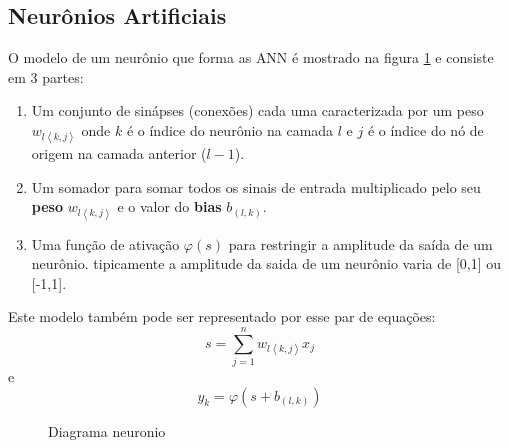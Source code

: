 \subsection{Neur\^onios Artificiais}
O modelo de um neur\^onio que forma as \ac{ANN} \'e mostrado na figura \ref{fig:neuronioartificial} e consiste em 3 partes:
\begin{enumerate}
	\item Um conjunto de sin\'apses (conex\~oes) cada uma caracterizada por um peso $w_{l\left< k,j \right> }$ onde $k$ \'e o \'indice do neur\^onio na camada $l$ e $j$ \'e o \'indice do n\'o de origem na camada anterior ($l-1$).
	\item Um somador para somar todos os sinais de entrada multiplicado pelo seu \textbf{peso} $w_{l\left< k,j \right> }$ e o valor do \textbf{bias} $b_{(l,k)}$.
	\item Uma fun\c{c}\~ao de ativa\c{c}\~ao $\varphi(s)$ para restringir a amplitude da sa\'ida de um neur\^onio. tipicamente a amplitude da saida de um neur\^onio varia de [0,1] ou [-1,1].
\end{enumerate}
Este modelo tamb\'em pode ser representado por esse par de equa\c{c}\~oes:
\begin{equation}
s=\sum_{j=1}^{n} w_{l\left< k,j \right> } x_j
\end{equation}
e
\begin{equation}
y_k=\varphi \left( s+b_{(l,k)} \right) 
\end{equation}
\begin{figure}[!h]
	\begin{center}
		\caption{Diagrama neuronio}		
		
		\label{fig:neuronioartificial}
	\end{center}	
\end{figure}
